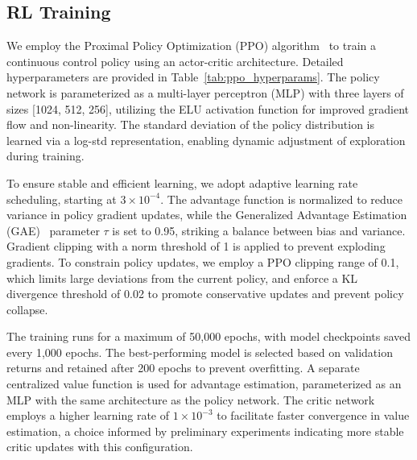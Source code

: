 \subsection{RL Training}\label{appendix:rl_training}
We employ the Proximal Policy Optimization (PPO) algorithm~\cite{schulman2017proximal} to train a continuous control policy using an actor-critic architecture. Detailed hyperparameters are provided in Table~\ref{tab:ppo_hyperparams}. The policy network is parameterized as a multi-layer perceptron (MLP) with three layers of sizes [1024, 512, 256], utilizing the ELU activation function for improved gradient flow and non-linearity. The standard deviation of the policy distribution is learned via a log-std representation, enabling dynamic adjustment of exploration during training.

To ensure stable and efficient learning, we adopt adaptive learning rate scheduling, starting at $3\times10^{-4}$. The advantage function is normalized to reduce variance in policy gradient updates, while the Generalized Advantage Estimation (GAE)~\cite{SchulmanMLJA15} parameter $\tau$ is set to 0.95, striking a balance between bias and variance. Gradient clipping with a norm threshold of 1 is applied to prevent exploding gradients. To constrain policy updates, we employ a PPO clipping range of 0.1, which limits large deviations from the current policy, and enforce a KL divergence threshold of 0.02 to promote conservative updates and prevent policy collapse.

The training runs for a maximum of 50,000 epochs, with model checkpoints saved every 1,000 epochs. The best-performing model is selected based on validation returns and retained after 200 epochs to prevent overfitting. A separate centralized value function is used for advantage estimation, parameterized as an MLP with the same architecture as the policy network. The critic network employs a higher learning rate of $1\times10^{-3}$ to facilitate faster convergence in value estimation, a choice informed by preliminary experiments indicating more stable critic updates with this configuration.


